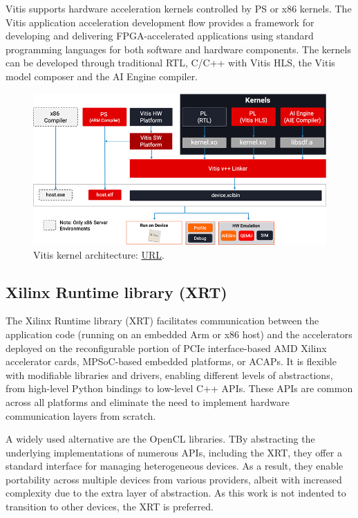 Vitis supports hardware acceleration kernels controlled by PS or x86 kernels. The Vitis application acceleration development flow provides a framework for developing and delivering FPGA-accelerated applications using standard programming languages for both software and hardware components. The kernels can be developed through traditional RTL, C/C++ with Vitis HLS, the Vitis model composer and the AI Engine compiler.
\begin{figure}[H]
    \centering
        \includegraphics[width=1\textwidth]{Images/Platform/vitis_kernel.png}
        \decoRule
        \caption[Vitis]{Vitis kernel architecture: \href{https://www.xilinx.com/products/design-tools/vitis/vitis-platform.html\#development}{URL}.}
        \label{fig:Vitis_kernel_overview}
\end{figure}

\subsection{Xilinx Runtime library (XRT)}
The Xilinx Runtime library\cite{Xilinx_Runtime_Library} (XRT) facilitates communication between the application code (running on an embedded Arm or x86 host) and the accelerators deployed on the reconfigurable portion of PCIe interface-based AMD Xilinx accelerator cards, MPSoC-based embedded platforms, or ACAPs. It is flexible with modifiable libraries and drivers, enabling different levels of abstractions, from high-level Python bindings to low-level C++ APIs. These APIs are common across all platforms and eliminate the need to implement hardware communication layers from scratch. %

A widely used alternative are the OpenCL libraries. TBy abstracting the underlying implementations of numerous APIs, including the XRT, they offer a standard interface for managing heterogeneous devices. As a result, they enable portability across multiple devices from various providers, albeit with increased complexity due to the extra layer of abstraction. As this work is not indented to transition to other devices, the XRT is preferred. %

